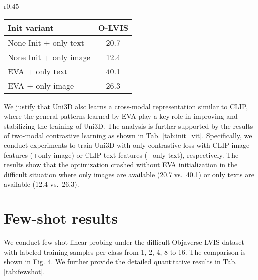 \documentclass{article} \usepackage{iclr2024_conference,times}
\def\Ours{Uni3D\xspace}
\begin{document}
\begin{wraptable}{r}{0.45\columnwidth}\small
\vspace{-0.8cm}

    \centering
    \caption{Effect of initializing \Ours under two-modal situation.}
\vspace{0.1cm}
    
    \begin{tabular}{l|c}
        \toprule
        Init variant &  O-LVIS \\ \midrule
        None Init + only text & 20.7  \\
        None Init + only image & 12.4  \\
        EVA + only text & 40.1  \\
        EVA + only image & 26.3  \\
        \bottomrule
    \end{tabular}
\vspace{-0.6cm}

    \label{tab:init_vit}
\end{wraptable}
We justify that \Ours also learns a cross-modal representation similar to CLIP, where the general patterns learned by EVA play a key role in improving and stabilizing the training of \Ours.  The analysis is further supported by the results of two-modal contrastive learning as shown in Tab. \ref{tab:init_vit}. Specifically, we conduct experiments to train \Ours with only contrastive loss with CLIP image features (+only image) or CLIP text features (+only text), respectively. The results show that the optimization crashed without EVA initialization in the difficult situation where only images are available (20.7 vs.\ 40.1) or only texts are available (12.4 vs.\ 26.3). 


\section{Few-shot results}
We conduct few-shot linear probing under the difficult Objaverse-LVIS dataset with labeled training samples per class from 1, 2, 4, 8 to 16. The comparison is shown in Fig. \hyperref[fig:fewshot]{4}. We further provide the detailed quantitative results in Tab. \ref{tab:fewshot}. 
\end{document}
